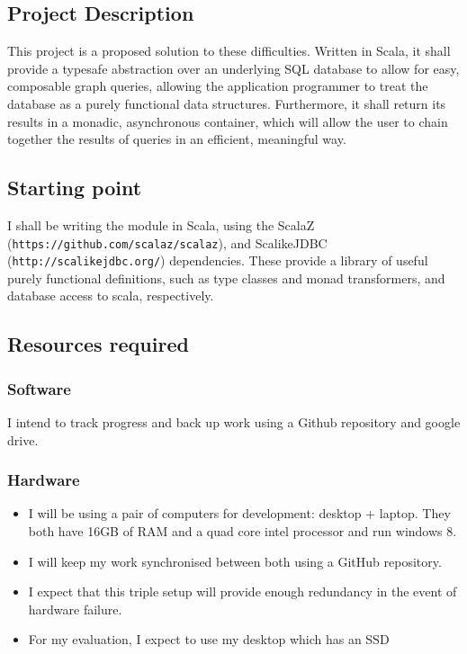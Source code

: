 \documentclass[12pt,a4paper,twoside,openright]{report}
\providecommand{\tightlist}{%
  \setlength{\itemsep}{0pt}\setlength{\parskip}{0pt}}
\begin{document}
\hypertarget{project-description}{%
\subsection{Project Description}\label{project-description}}

This project is a proposed solution to these difficulties. Written in
Scala, it shall provide a typesafe abstraction over an underlying SQL
database to allow for easy, composable graph queries, allowing the
application programmer to treat the database as a purely functional data
structures. Furthermore, it shall return its results in a monadic,
asynchronous container, which will allow the user to chain together the
results of queries in an efficient, meaningful way.

\hypertarget{starting-point}{%
\subsection{Starting point}\label{starting-point}}

I shall be writing the module in Scala, using the ScalaZ
(\texttt{https://github.com/scalaz/scalaz}), and ScalikeJDBC
(\texttt{http://scalikejdbc.org/}) dependencies. These provide a library
of useful purely functional definitions, such as type classes and monad
transformers, and database access to scala, respectively.

\hypertarget{resources-required}{%
\subsection{Resources required}\label{resources-required}}

\hypertarget{software}{%
\subsubsection{Software}\label{software}}

I intend to track progress and back up work using a Github repository
and google drive.

\hypertarget{hardware}{%
\subsubsection{Hardware}\label{hardware}}

\begin{itemize}
\tightlist
\item
  I will be using a pair of computers for development: desktop + laptop.
  They both have 16GB of RAM and a quad core intel processor and run
  windows 8.
\item
  I will keep my work synchronised between both using a GitHub
  repository.
\item
  I expect that this triple setup will provide enough redundancy in the
  event of hardware failure.
\item
  For my evaluation, I expect to use my desktop which has an SSD
\end{itemize}
\end{document}
